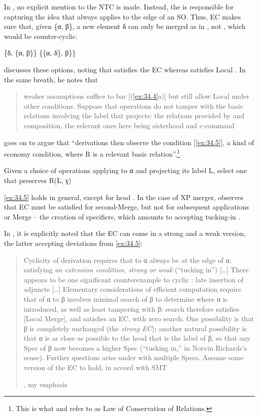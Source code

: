 \documentclass[output=paper]{langsci/langscibook}
\begin{document}
In \citet{Chomsky2000,Chomsky2001,Chomsky2004,Chomsky2005}, no explicit mention
to the \gls{NTC} is made. Instead, the \textsc{} is responsible
for capturing the idea that  always applies to the edge of an \gls{SO}.
Thus, \gls{EC} makes sure that, given \{α, β\}, a new element δ can only be
merged as in , not , which would be counter-cyclic.

\ea%
    \label{ex:34.4}
	\ea \{δ, \{α, β\}\} \label{ex:34.4a}
	\ex \{\{α, δ\}, β\}\} \label{ex:34.4b}
	\z
\z

\citet[136]{Chomsky2000} discusses these options, noting that  satisfies
the \gls{EC} whereas  satisfies Local . In the same breath, he
notes that \blockquote[{\citealt[136]{Chomsky2000}}][.]{weaker assumptions
    suffice to bar [(\ref{ex:34.4}a)] but still allow Local 
    under other conditions.  Suppose that operations do not tamper with the
    basic relations involving the label that projects: the relations provided
    by  and composition, the relevant ones here being sisterhood and
    c-command} \citet[137]{Chomsky2000} goes on to argue that
    \enquote{derivations then observe the condition [\eqref{ex:34.5}], a
        kind of economy condition, where R is a relevant basic
    relation}.\footnote{This is what \citet[Ch.\ 2]{LasUri2005} and
\citet[256]{EKS2012} refer to as Law of Conservation of Relations.}

\ea%
    \label{ex:34.5} Given a choice of operations applying to α and
    projecting its label L, select one that preserves R(L, γ)
\z

\eqref{ex:34.5} holds in general, except for head . In the case of XP merger,
\citet{Chomsky2000} observes that \gls{EC} must be satisfied for second-Merge, but
not for subsequent applications or Merge -- the creation of specifiers, which
amounts to accepting tucking-in \citep{Richards1997}.

In \citet{Chomsky2004}, it is explicitly noted that the \gls{EC} can come in a
strong and a weak version, the latter accepting deviations from
\eqref{ex:34.5}:

\blockquote[{\citealt[109]{Chomsky2004}, my emphasis}][.]{%
Cyclicity of derivation requires that  to α always be at the edge
of α, satisfying \emph{an extension condition, strong or weak}
(“tucking in”) [\dots{}] There appears to be one significant counterexample to
cyclic : late insertion of adjuncts [\dots{}] Elementary considerations of
efficient computation require that  of α to β involves
minimal search of β to determine where α is introduced, as
well as least tampering with β: search therefore satisfies [Local
Merge], and  satisfies an \gls{EC}, with zero search. One possibility is
that β is completely unchanged (the \emph{strong \gls{EC}}); another natural
possibility is that α is as close as possible to the head that is the label of
β, so that any Spec of β now becomes a higher Spec (“tucking in,” in Norvin
Richards’s sense). Further questions arise under  with multiple Specs.
Assume some version of the \gls{EC} to hold, in accord with
\gls{SMT}}
\end{document}
